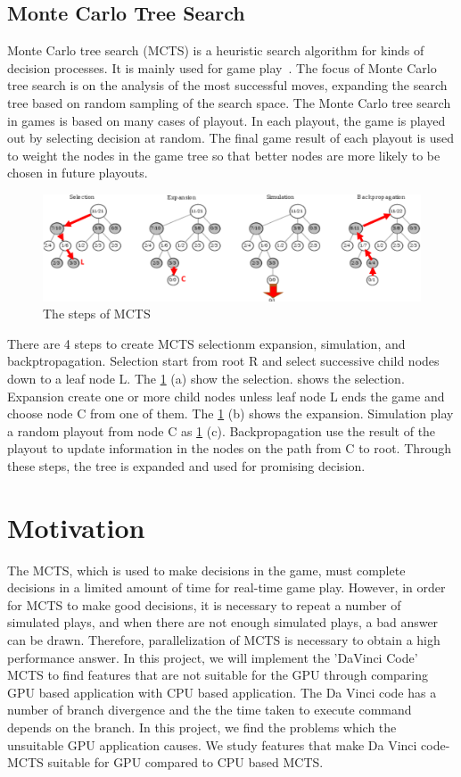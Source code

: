 \documentclass[conference]{IEEEtran}
\begin{document}
\subsection{Monte Carlo Tree Search}

Monte Carlo tree search (MCTS) is a heuristic search algorithm for kinds of decision processes.
It is mainly used for game play~\cite{MCTS}.  
The focus of Monte Carlo tree search is on the analysis of the most successful moves, expanding the search tree based on random sampling of the search space. 
The Monte Carlo tree search in games is based on many cases of playout. 
In each playout, the game is played out by selecting decision at random. 
The final game result of each playout is used to weight the nodes in the game tree so that better nodes are more likely to be chosen in future playouts.
\begin{figure}
\includegraphics[width=2.05\columnwidth]{figures/MCTS_step.pdf}
\caption{The steps of MCTS}
\label{fig:MCTS_step}
\end{figure}

There are 4 steps to create MCTS selectionm expansion, simulation, and backptropagation.
Selection start from root R and select successive child nodes down to a leaf node L. The \cref{fig:MCTS_step} (a) show the selection. shows the selection.
Expansion create one or more child nodes unless leaf node L ends the game and choose node C from one of them. The \cref{fig:MCTS_step} (b) shows the expansion.
Simulation play a random playout from node C as \cref{fig:MCTS_step} (c).
Backpropagation use the result of the playout to update information in the nodes on the path from C to root.
Through these steps, the tree is expanded and used for promising decision.

\section{Motivation}
The MCTS, which is used to make decisions in the game, must complete decisions in a limited amount of time for real-time game play. 
However, in order for MCTS to make good decisions, it is necessary to repeat a number of simulated plays, and when there are not enough simulated plays, a bad answer can be drawn. 
Therefore, parallelization of MCTS is necessary to obtain a high performance answer.
In this project, we will implement the 'DaVinci Code' MCTS to find features that are not suitable for the GPU through comparing GPU based application with CPU based application.
The Da Vinci code has a number of branch divergence and the the time taken to execute command depends on the branch.
In this project, we find the problems which the unsuitable GPU application causes.
We study features that make Da Vinci code-MCTS suitable for GPU compared to CPU based MCTS.
\end{document}
